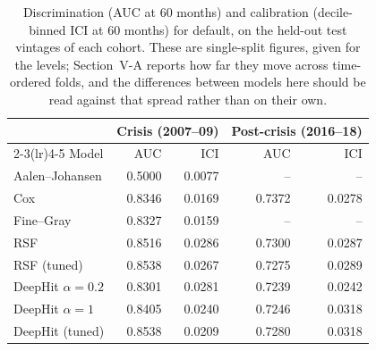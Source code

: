 \begin{table}[t]
\caption{Discrimination (AUC at 60 months) and calibration (decile-binned ICI at 60 months) for default, on the held-out test vintages of each cohort. These are single-split figures, given for the levels; Section~V-A reports how far they move across time-ordered folds, and the differences between models here should be read against that spread rather than on their own.}
\label{tab:main}
\centering\footnotesize
\begin{tabular}{@{}lrrrr@{}}
\toprule
& \multicolumn{2}{c}{Crisis (2007--09)} & \multicolumn{2}{c}{Post-crisis (2016--18)} \\
\cmidrule(lr){2-3}\cmidrule(lr){4-5}
Model & AUC & ICI & AUC & ICI \\
\midrule
Aalen--Johansen & 0.5000 & 0.0077 & -- & -- \\
Cox & 0.8346 & 0.0169 & 0.7372 & 0.0278 \\
Fine--Gray & 0.8327 & 0.0159 & -- & -- \\
RSF & 0.8516 & 0.0286 & 0.7300 & 0.0287 \\
RSF (tuned) & 0.8538 & 0.0267 & 0.7275 & 0.0289 \\
DeepHit $\alpha{=}0.2$ & 0.8301 & 0.0281 & 0.7239 & 0.0242 \\
DeepHit $\alpha{=}1$ & 0.8405 & 0.0240 & 0.7246 & 0.0318 \\
DeepHit (tuned) & 0.8538 & 0.0209 & 0.7280 & 0.0318 \\
\bottomrule
\end{tabular}
\end{table}
